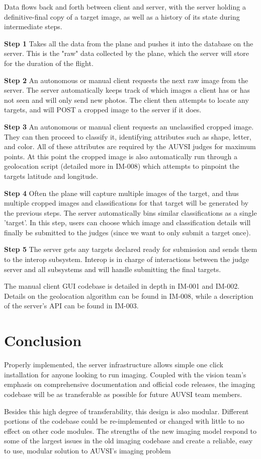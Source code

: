 \documentclass[]{auvsi_doc}
\begin{document}
Data flows back and forth between client and server, with the server holding a definitive-final
copy of a target image, as well as a history of its state during intermediate steps.

\textbf{Step 1} Takes all the data from the plane and pushes it into the database 
on the server. This is the "raw" data collected by the plane, which the server 
will store for the duration of the flight.

\textbf{Step 2} An autonomous or manual client requests the next raw image from the 
server. The server automatically keeps track of which images a client has or has not seen
and will only send new photos. The client then attempts to locate any targets, and will 
POST a cropped image to the server if it does.

\textbf{Step 3} An autonomous or manual client requests an unclassified cropped 
image. They can then proceed to classify it, identifying attributes such as shape,
letter, and color. All of these attributes are required by the AUVSI judges for 
maximum points. At this point the cropped image is also automatically run through 
a geolocation script (detailed more in IM-008) which attempts to pinpoint the 
targets latitude and longitude.

\textbf{Step 4} Often the plane will capture multiple images of the target, and thus 
multiple cropped images and classifications for that target will be generated by the 
previous steps. The server automatically bins similar classifications as a single 'target'.
In this step, users can choose which image and classification details will finally be submitted
to the judges (since we want to only submit a target once).

\textbf{Step 5} The server gets any targets declared ready for submission and sends
them to the interop subsystem. Interop is in charge of interactions between the 
judge server and all subsystems and will handle submitting the final targets.

The manual client GUI codebase is detailed in depth in IM-001 and IM-002. Details
on the geolocation algorithm can be found in IM-008, while a description of the server's
API can be found in IM-003.

\section{Conclusion}

Properly implemented, the server infrastructure allows simple one click installation
for anyone looking to run imaging. Coupled with the vision team's emphasis on comprehensive
documentation and official code releases, the imaging codebase will be as transferable as 
possible for future AUVSI team members.

Besides this high degree of transferability, this design is also modular. Different 
portions of the codebase could be re-implemented or changed with little to no effect on 
other code modules. The strengths of the new imaging model respond to some of the largest
issues in the old imaging codebase and create a reliable, easy to use, modular solution
to AUVSI's imaging problem
\end{document}
